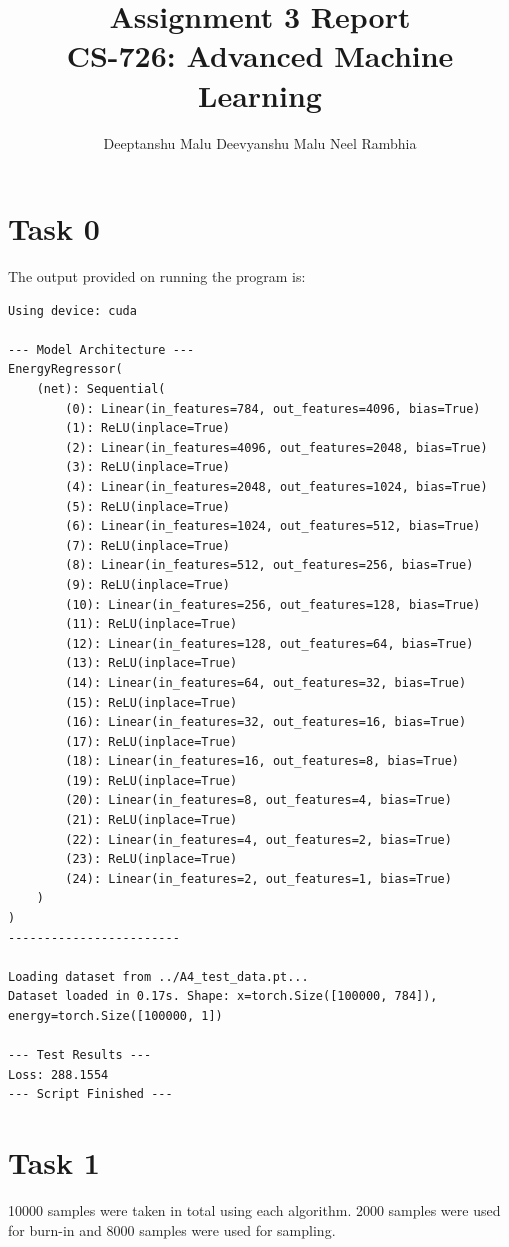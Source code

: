 \documentclass[11pt]{article}
\title{Assignment 3 Report\\
    CS-726: Advanced Machine Learning}
\author{Deeptanshu Malu \quad Deevyanshu Malu \quad Neel Rambhia}
\date{}
\begin{document}
\maketitle

\section{Task 0}

The output provided on running the program is:

\begin{verbatim}
Using device: cuda

--- Model Architecture ---
EnergyRegressor(
    (net): Sequential(
        (0): Linear(in_features=784, out_features=4096, bias=True)
        (1): ReLU(inplace=True)
        (2): Linear(in_features=4096, out_features=2048, bias=True)
        (3): ReLU(inplace=True)
        (4): Linear(in_features=2048, out_features=1024, bias=True)
        (5): ReLU(inplace=True)
        (6): Linear(in_features=1024, out_features=512, bias=True)
        (7): ReLU(inplace=True)
        (8): Linear(in_features=512, out_features=256, bias=True)
        (9): ReLU(inplace=True)
        (10): Linear(in_features=256, out_features=128, bias=True)
        (11): ReLU(inplace=True)
        (12): Linear(in_features=128, out_features=64, bias=True)
        (13): ReLU(inplace=True)
        (14): Linear(in_features=64, out_features=32, bias=True)
        (15): ReLU(inplace=True)
        (16): Linear(in_features=32, out_features=16, bias=True)
        (17): ReLU(inplace=True)
        (18): Linear(in_features=16, out_features=8, bias=True)
        (19): ReLU(inplace=True)
        (20): Linear(in_features=8, out_features=4, bias=True)
        (21): ReLU(inplace=True)
        (22): Linear(in_features=4, out_features=2, bias=True)
        (23): ReLU(inplace=True)
        (24): Linear(in_features=2, out_features=1, bias=True)
    )
)
------------------------

Loading dataset from ../A4_test_data.pt...
Dataset loaded in 0.17s. Shape: x=torch.Size([100000, 784]), energy=torch.Size([100000, 1])

--- Test Results ---
Loss: 288.1554
--- Script Finished ---
\end{verbatim}

\section{Task 1}

10000 samples were taken in total using each algorithm. 2000 samples were used for burn-in and 8000 samples were used for sampling.
\end{document}
